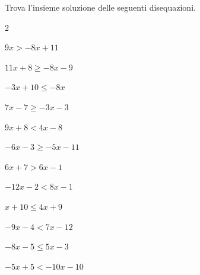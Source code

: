 \begin{esercizio}\label{ese:dis_12}
Trova l'insieme soluzione delle seguenti disequazioni.
\begin{htmulticols}{2}
\begin{enumeratea}
\item  \(9 x  > -8 x +11\) 
\item  \(11 x +8 \geqslant -8 x -9\) 
\item  \(-3 x +10 \leqslant -8 x \) 
\item  \(7 x -7 \geqslant -3 x -3\) 
\item  \(9 x +8 < 4 x -8\) 
\item  \(-6 x -3 \geqslant -5 x -11\) 
\item  \(6 x +7 > 6 x -1\) 
\item  \(-12 x -2 < 8 x -1\) 
\item  \(x +10 \leqslant 4 x +9\) 
\item  \(-9 x -4 < 7 x -12\) 
\item  \(-8 x -5 \leqslant 5 x -3\) 
\item  \(-5 x +5 < -10 x -10\) 
\end{enumeratea}
\end{htmulticols}
\end{esercizio}

